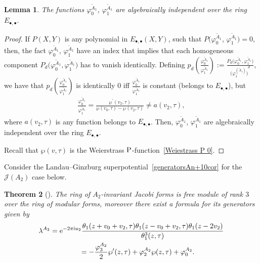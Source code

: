 \documentclass[pdftex]{sigma}%
\numberwithin{equation}{section}
\newtheorem{Theorem}{Theorem}[section]
\newtheorem{Lemma}[Theorem]{Lemma}
\newcommand{\Ja}{\mathcal{J}}
\begin{document}
\begin{Lemma}The functions $\varphi_0^{\tilde A_1}$, $\varphi_1^{\tilde A_1}$ are algebraically independent over the ring $E_{\bullet,\bullet}$.
\end{Lemma}
\begin{proof}
If $P(X,Y)$ is any polynomial in $E_{\bullet,\bullet}(X,Y)$, such that $P\big(\varphi_0^{\tilde A_1}$, $\varphi_1^{\tilde A_1}\big)=0$, then, the fact $\varphi_0^{\tilde A_1}$, $\varphi_1^{\tilde A_1}$ have an index that implies that each homogeneous component $P_d\big(\varphi_0^{\tilde A_1}, \varphi_1^{\tilde A_1}\big)$ has to vanish identically. Defining $p_d\left(\frac{\varphi_0^{\tilde A_1}}{\varphi_1^{\tilde A_1}}\right):=\frac{P_d\big(\varphi_0^{\tilde A_1}, \varphi_1^{\tilde A_1}\big)}{{\big(\varphi_1^{\left(\tilde A_1\right)}\big)}^d}$, we have that $p_d\left(\frac{\varphi_0^{\tilde A_1}}{\varphi_1^{\tilde A_1}}\right)$ is identically $0$ iff $\frac{\varphi_0^{\tilde A_1}}{\varphi_1^{\tilde A_1}}$ is constant (belongs to $E_{\bullet,\bullet}$), but
\begin{gather*}
\frac{\varphi_0^{\tilde A_1}}{\varphi_1^{\tilde A_1}}=\frac{\wp^{\prime}(v_2,\tau)}{\wp(v_0,\tau)-\wp(v_2,\tau)}\neq a(v_2,\tau),
\end{gather*}
where $a(v_2,\tau)$ is any function belongs to $E_{\bullet,\bullet}$.
Then, $\varphi_0^{\tilde A_1}$, $\varphi_1^{\tilde A_1}$ are algebraically independent over the ring $E_{\bullet,\bullet}$.

Recall that $\wp(v,\tau)$ is the Weierstrass $\rm P$-function~\eqref{Weiestrass P 0}.
\end{proof}

Consider the Landau--Ginzburg superpotential~\eqref{generatorsAn+10cor} for the $\Ja(A_2)$ case below.

\begin{Theorem}[\cite{BertolaM.1}]
The ring of $A_{2}$-invariant Jacobi forms is free module of rank $3$ over the ring of modular forms, moreover there exist a formula for its generators given by
\begin{gather}
\lambda^{A_{2}}={\rm e}^{-2\pi {\rm i} u_2}\frac{ \theta_1(z+v_0+v_{2},\tau)\theta_1(z-v_0+v_{2},\tau) \theta_1(z-2v_{2})}{\theta_1^{3}(z,\tau)}\nonumber
\\ \hphantom{\lambda^{A_{2}}}
=-\frac{\varphi_{3}^{A_{2}}}{2}\wp^{\prime}(z,\tau)+\varphi_{2}^{A_{2}}\wp(z,\tau)+\varphi_{0}^{A_{2}}.
\label{generatorsAn+10cor}
\end{gather}
\end{Theorem}
\end{document}
